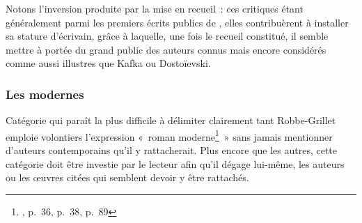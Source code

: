 \documentclass[12pt, a4paper]{article}
\begin{document}
Notons l'inversion produite par la mise en recueil~: ces critiques étant généralement parmi les premiers écrits publics de \robbe, elles contribuèrent à installer sa stature d'écrivain, grâce à laquelle, une fois le recueil constitué, il semble mettre à portée du grand public des auteurs connus mais encore considérés comme aussi illustres que Kafka ou Dostoïevski.




\subsubsection{Les modernes}


Catégorie qui paraît la plus difficile à délimiter clairement tant Robbe-Grillet emploie volontiers l'expression «~roman moderne\footnote{, p.~36, p.~38, p.~89}~» sans jamais mentionner d'auteurs contemporains qu'il y rattacherait. Plus encore que les autres, cette catégorie doit être investie par le lecteur afin qu'il dégage lui-même, les auteurs ou les œuvres citées qui semblent devoir y être rattachés.
\end{document}
